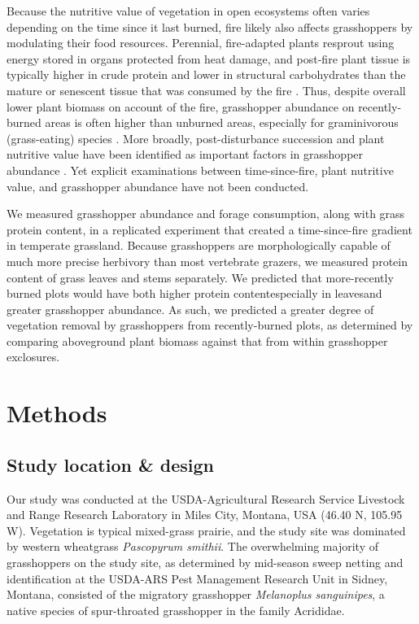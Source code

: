 \documentclass[referee, 
	            sn-basic]
           {sn-jnl}
\begin{document}
\begin{linenumbers}
Because the nutritive value of vegetation in open ecosystems often varies depending on the time since it last burned, fire likely also affects grasshoppers by modulating their food resources. 
Perennial, fire-adapted plants resprout using energy stored in organs protected from heat damage, and post-fire plant tissue is typically higher in crude protein and lower in structural carbohydrates than the mature or senescent tissue that was consumed by the fire \citep{mcgranahan2021}. 
Thus, despite overall lower plant biomass on account of the fire, grasshopper abundance on recently-burned areas is often higher than unburned areas, especially for graminivorous (grass-eating) species \citep{meyer2002}. 
More broadly, post-disturbance succession and plant nutritive value have been identified as important factors in grasshopper abundance \citep{fartmann2012, schirmel2019}. 
Yet explicit examinations between time-since-fire, plant nutritive value, and grasshopper abundance have not been conducted. 

We measured grasshopper abundance and forage consumption, along with grass protein content, in a replicated experiment that created a time-since-fire gradient in temperate grassland.  
Because grasshoppers are morphologically capable of much more precise herbivory than most vertebrate grazers, we measured protein content of grass leaves and stems separately.
We predicted that more-recently burned plots would have both higher protein content\textemdash especially in leaves\textemdash and greater grasshopper abundance. 
As such, we predicted a greater degree of vegetation removal by grasshoppers from recently-burned plots, as determined by comparing aboveground plant biomass against that from within grasshopper exclosures. 

\section{Methods}

\subsection{Study location \& design} 

Our study was conducted at the USDA-Agricultural Research Service Livestock and Range Research Laboratory in Miles City, Montana, USA (46.40 N, 105.95 W).  
Vegetation is typical mixed-grass prairie, and the study site was dominated by western wheatgrass \emph{Pascopyrum smithii}.  
The overwhelming majority of grasshoppers on the study site, as determined by mid-season sweep netting and identification at the USDA-ARS Pest Management Research Unit in Sidney, Montana, consisted of the migratory grasshopper \emph{Melanoplus sanguinipes}, a native species of spur-throated grasshopper in the family Acrididae. 


\end{linenumbers}
\end{document}
